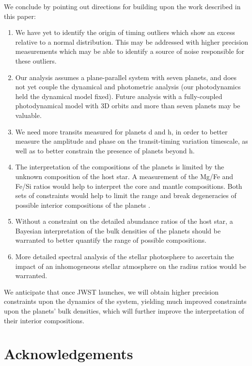\documentclass[twocolumn]{aastex63}
\begin{document}
We conclude by pointing out directions for building upon the work described in this paper:
\begin{enumerate}
    \item We have yet to identify the origin of timing outliers which
          show an excess relative to a normal distribution.  This may be addressed
          with higher precision measurements which may be able to identify a source
          of noise responsible for these outliers.
    \item Our analysis assumes a plane-parallel system with seven planets, and
          does not yet couple the dynamical and photometric analysis (our photodynamics
          held the dynamical model fixed).  Future analysis with a fully-coupled
          photodynamical model with 3D orbits and more than seven planets may be valuable.
    \item We need more transits measured for planets d and h, in order
          to better measure the amplitude and phase on the transit-timing variation
          timescale, as well as to better constrain the presence of planets beyond h.
    \item The interpretation of the compositions of the planets is limited by the unknown composition of the host star. A measurement of the Mg/Fe and Fe/Si ratios would help to interpret the core and mantle compositions.  Both sets of constraints would help to limit the range and break degeneracies of possible interior compositions of the planets \citep{Dorn2015,Bitsch2019b}.
    \item Without a constraint on the detailed abundance ratios of the host star, a Bayesian interpretation of the bulk densities of the planets should be warranted \citep{Dorn2016} to better quantify the range of possible compositions.
    \item More detailed spectral analysis of the stellar photosphere to ascertain the impact of an inhomogeneous stellar atmosphere on the radius ratios would be warranted.
\end{enumerate}

We anticipate that once JWST launches, we will obtain higher precision constraints upon the dynamics of the system, yielding much improved constraints upon the planets' bulk densities, which will further improve the interpretation of their interior compositions.

\section*{Acknowledgements}
\end{document}
